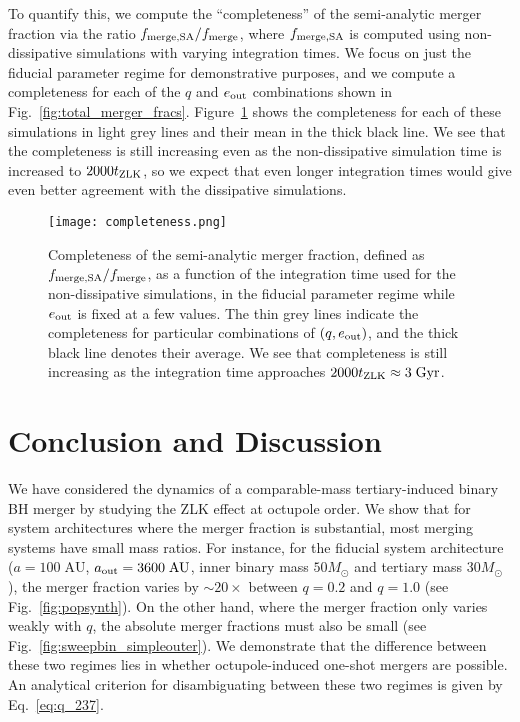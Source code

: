 \documentclass[
        fleqn,
        usenatbib,
    ]{mnras}
\newlength{\colummwidth}
\begin{document}
To quantify this, we compute the ``completeness'' of the semi-analytic merger
fraction via the ratio $f_{\rm merge, SA} / f_{\rm merge}$, where $f_{\rm merge,
SA}$ is computed using non-dissipative simulations with varying integration
times. We focus on just the fiducial parameter regime for demonstrative
purposes, and we compute a completeness for each of the $q$ and $e_{\rm out}$
combinations shown in Fig.~\ref{fig:total_merger_fracs}.
Figure~\ref{fig:completeness} shows the completeness for each of these
simulations in light grey lines and their mean in the thick black line. We see
that the completeness is still increasing even as the non-dissipative simulation
time is increased to $2000t_{\rm ZLK}$, so we expect that even longer
integration times would give even better agreement with the dissipative
simulations.
\begin{figure}
    \centering
    \texttt{[image: completeness.png]}
    \caption{Completeness of the semi-analytic merger fraction, defined as
    $f_{\rm merge, SA} / f_{\rm merge}$, as a function of the integration time
    used for the non-dissipative simulations, in the fiducial
    parameter regime while $e_{\rm out}$ is fixed at a few values. The thin grey
    lines indicate the completeness for particular combinations of $(q, e_{\rm
    out})$, and the thick black line denotes their average. We see that
    completeness is still increasing as the integration time approaches $2000
    t_{\rm ZLK} \approx 3\;\mathrm{Gyr}$. }\label{fig:completeness}
\end{figure}

\section{Conclusion and Discussion}\label{s:conclusion}

We have considered the dynamics of a comparable-mass tertiary-induced binary BH
merger by studying the ZLK effect at octupole order. We show that for system
architectures where the merger fraction is substantial, most merging systems
have small mass ratios. For instance, for the fiducial system architecture ($a =
100\;\mathrm{AU}$, $a_{\rm out} = 3600\;\mathrm{AU}$, inner binary mass
$50M_{\odot}$ and tertiary mass $30M_{\odot}$), the merger fraction varies by
$\sim 20\times$ between $q = 0.2$ and $q = 1.0$ (see Fig.~\ref{fig:popsynth}).
On the other hand, where the merger fraction only varies weakly with $q$, the
absolute merger fractions must also be small (see
Fig.~\ref{fig:sweepbin_simpleouter}). We demonstrate that the difference between
these two regimes lies in whether octupole-induced one-shot mergers are
possible. An analytical criterion for disambiguating between these two regimes
is given by Eq.~\eqref{eq:q_237}.
\end{document}
